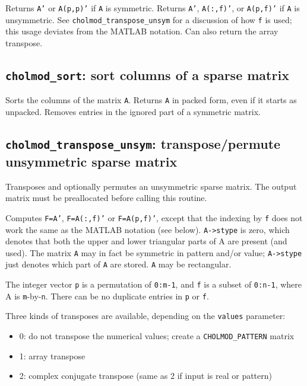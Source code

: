 \documentclass[11pt]{article}
\begin{document}

Returns {\tt A'} or {\tt A(p,p)'} if {\tt A} is symmetric.
Returns {\tt A'}, {\tt A(:,f)'}, or {\tt A(p,f)'} if {\tt A} is unsymmetric.
See {\tt cholmod\_transpose\_unsym} for a discussion of how {\tt f} is used;
this usage deviates from the MATLAB notation.
Can also return the array transpose.

\subsection{{\tt cholmod\_sort}: sort columns of a sparse matrix}


Sorts the columns of the matrix {\tt A}.  Returns  {\tt A} in packed form, even if it
starts as unpacked.  Removes entries in the ignored part of a symmetric matrix.

\newpage \subsection{{\tt cholmod\_transpose\_unsym}: transpose/permute unsymmetric sparse matrix}


Transposes and optionally permutes an unsymmetric sparse matrix.
The output matrix must be preallocated before calling this routine.

Computes {\tt F=A'}, {\tt F=A(:,f)'} or {\tt F=A(p,f)'}, except that the
indexing by {\tt f} does not work the same as the MATLAB notation (see below).
{\tt A->stype} is zero, which denotes that both the upper and lower triangular
parts of A are present (and used).  The matrix {\tt A} may in fact be symmetric in pattern
and/or value; {\tt A->stype} just denotes which part of {\tt A} are stored.  {\tt A} may be
rectangular.
 
The integer vector
{\tt p} is a permutation of {\tt 0:m-1}, and {\tt f} is a subset of {\tt 0:n-1},
where A is {\tt m}-by-{\tt n}.
There can be no duplicate entries in {\tt p} or {\tt f}.

\noindent
Three kinds of transposes are available, depending on the {\tt values} parameter:
\begin{itemize}
\item    0: do not transpose the numerical values; create a {\tt CHOLMOD\_PATTERN} matrix
\item    1: array transpose
\item    2: complex conjugate transpose (same as 2 if input is real or pattern)
\end{itemize}
\end{document}
